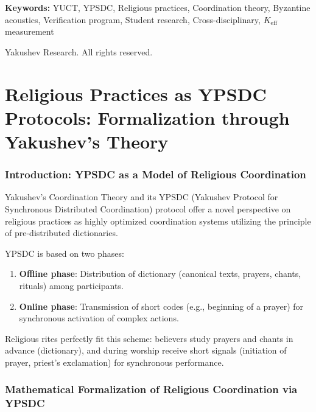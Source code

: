 \documentclass[12pt,a4paper]{article}
\begin{document}
\begin{titlepage}
\begin{center}
			\vspace{0cm}
			
			\noindent
			\small\textbf{Keywords:} YUCT, YPSDC, Religious practices, Coordination theory, Byzantine acoustics, Verification program, Student research, Cross-disciplinary, $K_{\mathrm{eff}}$ measurement
			
			\vspace{0.5cm}
			
			\noindent
			 Yakushev Research. All rights reserved.
		\end{center}
	\end{titlepage}
	
	\tableofcontents
	
	\newpage
	
	\part{Religious Practices as YPSDC Protocols: Formalization through Yakushev's Theory}
	
	\section{Introduction: YPSDC as a Model of Religious Coordination}
	
	Yakushev's Coordination Theory and its YPSDC (Yakushev Protocol for Synchronous Distributed Coordination) protocol offer a novel perspective on religious practices as highly optimized coordination systems utilizing the principle of pre-distributed dictionaries.
	
	YPSDC is based on two phases:
	\begin{enumerate}
		\item \textbf{Offline phase}: Distribution of dictionary (canonical texts, prayers, chants, rituals) among participants.
		\item \textbf{Online phase}: Transmission of short codes (e.g., beginning of a prayer) for synchronous activation of complex actions.
	\end{enumerate}
	
	Religious rites perfectly fit this scheme: believers study prayers and chants in advance (dictionary), and during worship receive short signals (initiation of prayer, priest's exclamation) for synchronous performance.
	
	\section{Mathematical Formalization of Religious Coordination via YPSDC}
	
\end{document}
